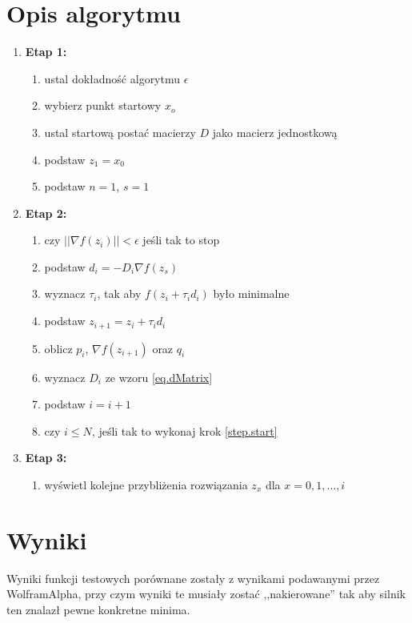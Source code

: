 \documentclass{classrep}
\begin{document}
\section{Opis algorytmu}
\begin{enumerate}
  \item \textbf{Etap 1:}
    \begin{enumerate}
      \item ustal dokładność algorytmu $\epsilon$
      \item wybierz punkt startowy $x_o$
      \item ustal startową postać macierzy $D$ jako macierz jednostkową 
      \item podstaw $z_1 = x_0$
      \item podstaw $n = 1$, $s = 1$
    \end{enumerate}
  \item \textbf{Etap 2:}
    \begin{enumerate}
      \item czy $||\nabla f(z_i)|| < \epsilon $ jeśli tak to stop \label{step.start}
      \item podstaw $d_i = -D_i \nabla f(z_s)$
      \item wyznacz $\tau_i$, tak aby $f(z_i + \tau_i d_i)$ było minimalne
      \item podstaw $z_{i+1} = z_i + \tau_i d_i$
      \item oblicz $p_i$, $\nabla f(z_{i + 1})$ oraz $q_i$
      \item wyznacz $D_i$ ze wzoru \ref{eq.dMatrix}
      \item podstaw $i = i + 1$
      \item czy $i \leq N$, jeśli tak to wykonaj krok \ref{step.start}
    \end{enumerate}
  \item \textbf{Etap 3:}
    \begin{enumerate}
      \item wyświetl kolejne przybliżenia rozwiązania $z_x$ dla $x = 0, 1, \ldots, i$
    \end{enumerate}
\end{enumerate}

\section{Wyniki}
Wyniki funkcji testowych porównane zostały z wynikami podawanymi przez WolframAlpha, przy czym wyniki te musiały zostać ,,nakierowane'' tak aby silnik ten znalazł pewne konkretne minima.
\end{document}
